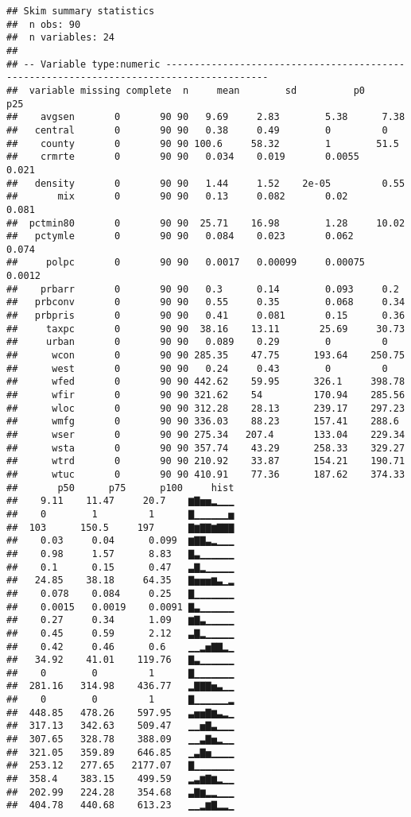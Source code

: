 \documentclass[]{article}
\begin{document}
\begin{verbatim}
## Skim summary statistics
##  n obs: 90 
##  n variables: 24 
## 
## -- Variable type:numeric ----------------------------------------------------------------------------------------
##  variable missing complete  n     mean        sd          p0      p25
##    avgsen       0       90 90   9.69     2.83        5.38      7.38  
##   central       0       90 90   0.38     0.49        0         0     
##    county       0       90 90 100.6     58.32        1        51.5   
##    crmrte       0       90 90   0.034    0.019       0.0055    0.021 
##   density       0       90 90   1.44     1.52    2e-05         0.55  
##       mix       0       90 90   0.13     0.082       0.02      0.081 
##  pctmin80       0       90 90  25.71    16.98        1.28     10.02  
##   pctymle       0       90 90   0.084    0.023       0.062     0.074 
##     polpc       0       90 90   0.0017   0.00099     0.00075   0.0012
##    prbarr       0       90 90   0.3      0.14        0.093     0.2   
##   prbconv       0       90 90   0.55     0.35        0.068     0.34  
##   prbpris       0       90 90   0.41     0.081       0.15      0.36  
##     taxpc       0       90 90  38.16    13.11       25.69     30.73  
##     urban       0       90 90   0.089    0.29        0         0     
##      wcon       0       90 90 285.35    47.75      193.64    250.75  
##      west       0       90 90   0.24     0.43        0         0     
##      wfed       0       90 90 442.62    59.95      326.1     398.78  
##      wfir       0       90 90 321.62    54         170.94    285.56  
##      wloc       0       90 90 312.28    28.13      239.17    297.23  
##      wmfg       0       90 90 336.03    88.23      157.41    288.6   
##      wser       0       90 90 275.34   207.4       133.04    229.34  
##      wsta       0       90 90 357.74    43.29      258.33    329.27  
##      wtrd       0       90 90 210.92    33.87      154.21    190.71  
##      wtuc       0       90 90 410.91    77.36      187.62    374.33  
##       p50      p75      p100     hist
##    9.11    11.47     20.7    ▆▇▅▅▂▁▁▁
##    0        1         1      ▇▁▁▁▁▁▁▅
##  103      150.5     197      ▇▆▇▇▆▇▇▇
##    0.03     0.04      0.099  ▆▇▇▃▂▁▁▁
##    0.98     1.57      8.83   ▇▃▁▁▁▁▁▁
##    0.1      0.15      0.47   ▃▇▂▁▁▁▁▁
##   24.85    38.18     64.35   ▇▅▅▅▆▃▁▂
##    0.078    0.084     0.25   ▇▁▁▁▁▁▁▁
##    0.0015   0.0019    0.0091 ▇▃▁▁▁▁▁▁
##    0.27     0.34      1.09   ▆▇▃▁▁▁▁▁
##    0.45     0.59      2.12   ▃▇▂▁▁▁▁▁
##    0.42     0.46      0.6    ▁▁▂▅▇▇▂▁
##   34.92    41.01    119.76   ▇▃▁▁▁▁▁▁
##    0        0         1      ▇▁▁▁▁▁▁▁
##  281.16   314.98    436.77   ▂▇▇▇▅▃▁▁
##    0        0         1      ▇▁▁▁▁▁▁▂
##  448.85   478.26    597.95   ▃▅▅▇▆▃▂▁
##  317.13   342.63    509.47   ▁▁▅▇▃▁▁▁
##  307.65   328.78    388.09   ▁▁▃▇▅▂▁▁
##  321.05   359.89    646.85   ▁▃▇▅▁▁▁▁
##  253.12   277.65   2177.07   ▇▁▁▁▁▁▁▁
##  358.4    383.15    499.59   ▂▃▆▇▆▂▁▁
##  202.99   224.28    354.68   ▃▇▆▂▂▁▁▁
##  404.78   440.68    613.23   ▁▁▂▆▇▂▂▁
\end{verbatim}
\end{document}
